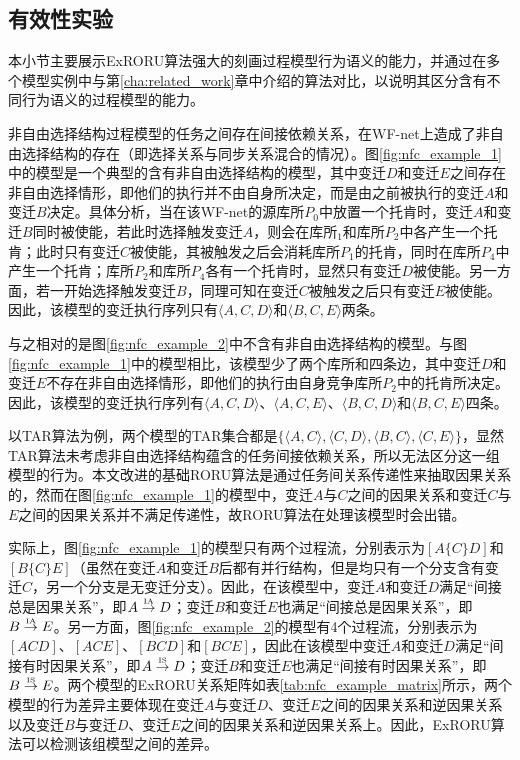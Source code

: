 \subsection{有效性实验}\label{subsec:effectiveness}
本小节主要展示ExRORU算法强大的刻画过程模型行为语义的能力，并通过在多个模型实例中与第\ref{cha:related_work}章中介绍的算法对比，以说明其区分含有不同行为语义的过程模型的能力。

{\heiti 非自由选择结构\qquad}过程模型的任务之间存在间接依赖关系\cite{van2004workflow,van2003workflow,de2003workflow,van2004process}，在WF-net上造成了非自由选择结构的存在（即选择关系与同步关系混合的情况）。图\ref{fig:nfc_example_1}中的模型是一个典型的含有非自由选择结构的模型，其中变迁$D$和变迁$E$之间存在非自由选择情形，即他们的执行并不由自身所决定，而是由之前被执行的变迁$A$和变迁$B$决定。具体分析，当在该WF-net的源库所$P_{0}$中放置一个托肯时，变迁$A$和变迁$B$同时被使能，若此时选择触发变迁$A$，则会在库所$_{1}$和库所$P_{2}$中各产生一个托肯；此时只有变迁$C$被使能，其被触发之后会消耗库所$P_{1}$的托肯，同时在库所$P_{4}$中产生一个托肯；库所$P_{2}$和库所$P_{4}$各有一个托肯时，显然只有变迁$D$被使能。另一方面，若一开始选择触发变迁$B$，同理可知在变迁$C$被触发之后只有变迁$E$被使能。因此，该模型的变迁执行序列只有$\langle A,C,D\rangle$和$\langle B,C,E\rangle$两条。

与之相对的是图\ref{fig:nfc_example_2}中不含有非自由选择结构的模型。与图\ref{fig:nfc_example_1}中的模型相比，该模型少了两个库所和四条边，其中变迁$D$和变迁$E$不存在非自由选择情形，即他们的执行由自身竞争库所$P_{2}$中的托肯所决定。因此，该模型的变迁执行序列有$\langle A,C,D\rangle$、$\langle A,C,E\rangle$、$\langle B,C,D\rangle$和$\langle B,C,E\rangle$四条。

以TAR算法为例，两个模型的TAR集合都是$\{\langle A,C\rangle,\langle C,D\rangle,\langle B,C\rangle,\langle C,E\rangle\}$，显然TAR算法未考虑非自由选择结构蕴含的任务间接依赖关系，所以无法区分这一组模型的行为。本文改进的基础RORU算法是通过任务间关系传递性来抽取因果关系的，然而在图\ref{fig:nfc_example_1}的模型中，变迁$A$与$C$之间的因果关系和变迁$C$与$E$之间的因果关系并不满足传递性，故RORU算法在处理该模型时会出错。

实际上，图\ref{fig:nfc_example_1}的模型只有两个过程流，分别表示为$[A\{C\}D]$和$[B\{C\}E]$（虽然在变迁$A$和变迁$B$后都有并行结构，但是均只有一个分支含有变迁$C$，另一个分支是无变迁分支）。因此，在该模型中，变迁$A$和变迁$D$满足“间接总是因果关系”，即$A\overset{\text{\tiny{IA}}}{\rightarrow}D$；变迁$B$和变迁$E$也满足“间接总是因果关系”，即$B\overset{\text{\tiny{IA}}}{\rightarrow}E$。另一方面，图\ref{fig:nfc_example_2}的模型有4个过程流，分别表示为$[ACD]$、$[ACE]$、$[BCD]$和$[BCE]$，因此在该模型中变迁$A$和变迁$D$满足“间接有时因果关系”，即$A\overset{\text{\tiny{IS}}}{\rightarrow}D$；变迁$B$和变迁$E$也满足“间接有时因果关系”，即$B\overset{\text{\tiny{IS}}}{\rightarrow}E$。两个模型的ExRORU关系矩阵如表\ref{tab:nfc_example_matrix}所示，两个模型的行为差异主要体现在变迁$A$与变迁$D$、变迁$E$之间的因果关系和逆因果关系以及变迁$B$与变迁$D$、变迁$E$之间的因果关系和逆因果关系上。因此，ExRORU算法可以检测该组模型之间的差异。

